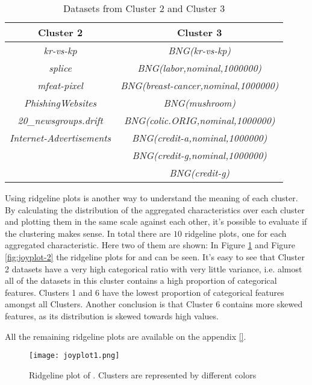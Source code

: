 \begin{table}[h!] 
    \centering
    \begin{tabular}{||c c||} 
     \hline
     Cluster 2 & Cluster 3 \\ [0.5ex] 
     \hline\hline
     \textit{kr-vs-kp} & \textit{BNG(kr-vs-kp)} \\
     \textit{splice} & \textit{BNG(labor,nominal,1000000)} \\
     \textit{mfeat-pixel} & \textit{BNG(breast-cancer,nominal,1000000)} \\
     \textit{PhishingWebsites} & \textit{BNG(mushroom)} \\
     \textit{20\_newsgroups.drift} & \textit{BNG(colic.ORIG,nominal,1000000)} \\
     \textit{Internet-Advertisements} & \textit{BNG(credit-a,nominal,1000000)} \\
     & \textit{BNG(credit-g,nominal,1000000)} \\
     & \textit{BNG(credit-g)} \\[1ex] 
     \hline
    \end{tabular}
    \caption{Datasets from Cluster 2 and Cluster 3}
    \label{table:1}
\end{table}

Using ridgeline plots is another way to understand the meaning of each cluster. By calculating the distribution of the aggregated characteristics over each cluster and plotting them in the same scale against each other, it's possible to evaluate if the clustering makes sense. In total there are $10$ ridgeline plots, one for each aggregated characteristic. Here two of them are shown: In Figure \ref{fig:joyplot-1} and Figure \ref{fig:joyplot-2} the ridgeline plots for  and  can be seen. It's easy to see that Cluster 2 datasets have a very high categorical ratio with very little variance, i.e. almost all of the datasets in this cluster contains a high proportion of categorical features. Clusters 1 and 6 have the lowest proportion of categorical features amongst all Clusters. Another conclusion is that Cluster 6 contains more skewed features, as its distribution is skewed towards high  values.

All the remaining ridgeline plots are available on the appendix \ref{}.

\begin{figure}[!h]
    \centering
    \texttt{[image: joyplot1.png]}
    \caption{Ridgeline plot of . Clusters are represented by different colors}
    \label{fig:joyplot-1}
\end{figure}

